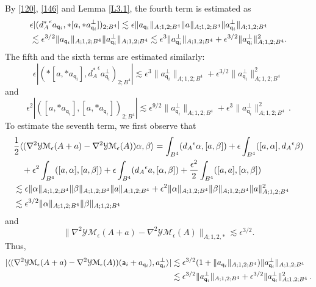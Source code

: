 \documentclass[11pt]{article}
\numberwithin{equation}{section} \setlength{\topmargin}{-35pt}
\newcommand{\YMe}{\mathcal{YM}_{\epsilon}}
\newcommand{\q}{\mathsf{q}}
\newcommand{\A}{\mathsf{a}}
\begin{document}
By \eqref{120}, \eqref{146} and Lemma \ref{L3.1}, the fourth term is
estimated as
\begin{align}
\label{155}  &\epsilon|( {d_A^{\ast}}^{\epsilon}a_{\q_i},\ast[a,\ast
a_{\q_i}^{\perp}])_{2;B^4}|
\lesssim\epsilon\|a_{\q_i}\|_{A;1,2;B^4}\|a\|_{A;1,2;B^4}\|a_{\q_i}^{\perp}\|_{A;1,2;B^4}
\notag\\
 &\lesssim\epsilon^{3/2}\|a_{\q_i}\|_{A;1,2;B^4}\|a_{\q_i}^{\perp}\|_{A;1,2;B^4}
\lesssim\epsilon^3\|a_{\q_i}^{\perp}\|_{A;1,2;B^4}+\epsilon^{3/2}\|a_{\q_i}^{\perp}\|_{A;1,2;B^4}^2.
\end{align}
The fifth and the sixth terms are estimated similarly:
\begin{equation}
\label{156} \epsilon|(\ast[a,\ast
a_{\q_i}],{d_A^{\ast}}^{\epsilon}a_{\q_i}^{\perp})_{2;B^4}|\lesssim
\epsilon^3\|a_{\q_i}^{\perp}\|_{A;1,2;B^4}+\epsilon^{3/2}\|a_{\q_i}^{\perp}\|_{A;1,2;B^4}^2\,
\end{equation}
and
\begin{equation}
\label{157} \epsilon^2|([a,\ast a_{\q_i}],[a,\ast
a_{\q_i}])_{2;B^4}|\lesssim\epsilon^{9/2}\|a_{\q_i}^{\perp}\|_{A;1,2;B^4}+\epsilon^3\|a_{\q_i}^{\perp}\|_{A;1,2;B^4}^2\,.
\end{equation}
To estimate the seventh term, we first observe that
\begin{align}
\label{158}
&\frac{1}{2}\langle(\nabla^2\YMe(A+a)-\nabla^2\YMe(A))\alpha,\beta\rangle
=\int_{B^4}({d_A}^{\epsilon}\alpha,[a,\beta])+\epsilon\int_{B^4}([a,\alpha],{d_A}^{\epsilon}\beta)\notag\\
&\quad+\epsilon^2\int_{B^4}([a,\alpha],[a,\beta])+\epsilon\int_{B^4}({d_A}^{\epsilon}a,[\alpha,\beta])
+\frac{\epsilon^2}{2}\int_{B^4}([a,a],[\alpha,\beta])\notag\\
&\lesssim\epsilon\|\alpha\|_{A;1,2;B^4}\|\beta\|_{A;1,2;B^4}\|a\|_{A;1,2;B^4}+\epsilon^2\|\alpha\|_{A;1,2;B^4}\|\beta\|_{A;1,2;B^4}\|a\|_{A;1,2;B^4}^2\notag\\
&\lesssim\epsilon^{3/2}\|\alpha\|_{A;1,2;B^4}\|\beta\|_{A;1,2;B^4}
\end{align}
and
\begin{equation}
\label{159}
\|\nabla^2\YMe(A+a)-\nabla^2\YMe(A)\|_{A;1,2,\ast}\lesssim\epsilon^{3/2}.
\end{equation}
Thus,
\begin{align}
\label{160}
 |\langle(\nabla^2\YMe(A+a)-\nabla^2\YMe(A))(\A_i+a_{\q_i}),a_{\q_i}^{\perp}\rangle|
&\lesssim\epsilon^{3/2}(1+\|a_{\q_i}\|_{A;1,2;B^4})\|a_{\q_i}^{\perp}\|_{A;1,2;B^4}\notag\\
&\lesssim\epsilon^{3/2}\|a_{\q_i}^{\perp}\|_{A;1,2;B^4}+\epsilon^{3/2}\|a_{\q_i}^{\perp}\|_{A;1,2;B^4}^2\,.
\end{align}
\end{document}
